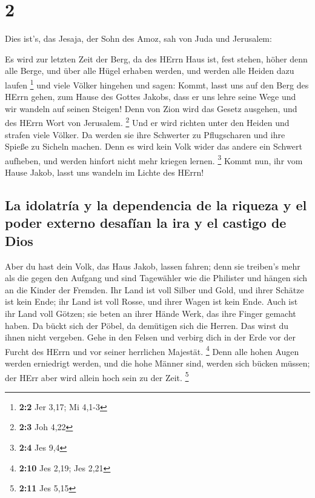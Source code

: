 \hypertarget{section-1}{%
\section{2}\label{section-1}}

 Dies ist's, das Jesaja, der Sohn des Amoz, sah von Juda
und Jerusalem:

 Es wird zur letzten Zeit der Berg, da des HErrn Haus ist,
fest stehen, höher denn alle Berge, und über alle Hügel erhaben werden,
und werden alle Heiden dazu laufen \footnote{\textbf{2:2} Jer 3,17; Mi
  4,1-3}  und viele Völker hingehen und sagen: Kommt,
lasst uns auf den Berg des HErrn gehen, zum Hause des Gottes Jakobs,
dass er uns lehre seine Wege und wir wandeln auf seinen Steigen! Denn
von Zion wird das Gesetz ausgehen, und des HErrn Wort von Jerusalem.
\footnote{\textbf{2:3} Joh 4,22}  Und er wird richten
unter den Heiden und strafen viele Völker. Da werden sie ihre Schwerter
zu Pflugscharen und ihre Spieße zu Sicheln machen. Denn es wird kein
Volk wider das andere ein Schwert aufheben, und werden hinfort nicht
mehr kriegen lernen. \footnote{\textbf{2:4} Jes 9,4} 
Kommt nun, ihr vom Hause Jakob, lasst uns wandeln im Lichte des HErrn!

\hypertarget{la-idolatruxeda-y-la-dependencia-de-la-riqueza-y-el-poder-externo-desafuxedan-la-ira-y-el-castigo-de-dios}{%
\subsection{La idolatría y la dependencia de la riqueza y el poder
externo desafían la ira y el castigo de
Dios}\label{la-idolatruxeda-y-la-dependencia-de-la-riqueza-y-el-poder-externo-desafuxedan-la-ira-y-el-castigo-de-dios}}

 Aber du hast dein Volk, das Haus Jakob, lassen fahren;
denn sie treiben's mehr als die gegen den Aufgang und sind Tagewähler
wie die Philister und hängen sich an die Kinder der Fremden.
 Ihr Land ist voll Silber und Gold, und ihrer Schätze ist
kein Ende; ihr Land ist voll Rosse, und ihrer Wagen ist kein Ende.
 Auch ist ihr Land voll Götzen; sie beten an ihrer Hände
Werk, das ihre Finger gemacht haben.  Da bückt sich der
Pöbel, da demütigen sich die Herren. Das wirst du ihnen nicht vergeben.
 Gehe in den Felsen und verbirg dich in der Erde vor der
Furcht des HErrn und vor seiner herrlichen Majestät. \footnote{\textbf{2:10}
  Jes 2,19; Jes 2,21}  Denn alle hohen Augen werden
erniedrigt werden, und die hohe Männer sind, werden sich bücken müssen;
der HErr aber wird allein hoch sein zu der Zeit. \footnote{\textbf{2:11}
  Jes 5,15}

